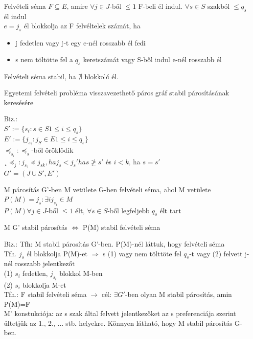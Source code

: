 	\begin{definition}{Felvételi séma}{}
		$F \subseteq E$, amire $\forall j \in J$-ből $\leq 1$ F-beli él indul. $\forall s \in S$ szakból $\leq q_s$ él indul \\
		$e = j_s$ él blokkolja az F felvéltelek számát, ha
		\begin{itemize}
			\item j fedetlen vagy j-t egy e-nél rosszabb él fedi
			\item s nem töltötte fel a $q_s$ keretszámát vagy S-ből indul e-nél rosszabb él
		\end{itemize}
	\end{definition}
	
	\begin{statement}{}{}
		Felvételi séma stabil, ha $\nexists$ blokkoló él.
	\end{statement}
	
	\begin{statement}{}{}
		Egyetemi felvételi probléma visszavezethető páros gráf stabil párosításának keresésére
	\end{statement}
	Biz.: \\
	$S':=\{s_i: s \in S 1 \leq i\leq q_s\}$ \\
	$E':=\{j_{s_i}: j_S \in E 1 \leq i\leq q_s\}$ \\
	$\preceq_{s_i}: \preceq_s$-ből öröklődik \\
	$˛\preceq_j: j_{s_i} \preceq j_{sk}, ha j_s < j_s' ha s \ngeq s'$ és $i < k$, ha $s=s'$ \\
	$G'=(J \cup S',E')$
	
	\begin{statement}{M párosítás G'-ben}{}
		M vetülete G-ben felvételi séma, ahol M vetülete $P(M)={j_s : \exists i j_{s_i} \in M}$ \\
		$P(M) \forall j \in J$-ből $\leq 1$ élt, $\forall s \in S$-ből legfeljebb $q_s$ élt tart
	\end{statement}
	
	\begin{statement}{}{}
		M G' stabil párosítás $\Leftrightarrow$ P(M) stabil felvételi séma
	\end{statement}
	Biz.: 
	Tfh: M stabil párosítás G'-ben. P(M)-nél láttuk, hogy felvételi séma \\
	Tfh. $j_s$ él blokkolja P(M)-et $\Rightarrow$ s (1) vagy nem tölttöte fel $q_s$-t vagy (2) felvett j-nél rosszabb jelentkezőt \\
	(1) $s_i$ fedetlen, $j_{s_i}$ blokkol M-ben  \\
	(2) $s_i$ blokkolja M-et \\
	Tfh.: F stabil felvételi séma $\rightarrow$ cél: $\exists G'$-ben olyan M stabil párosítás, amin P(M)=F\\
	M' konstukciója: az s szak által felvett jelentkezőket az s preferenciája szerint ültetjük az 1., 2., ... stb. helyekre. Könnyen látható, hogy M stabil párosítás G-ben.
	\\
	
